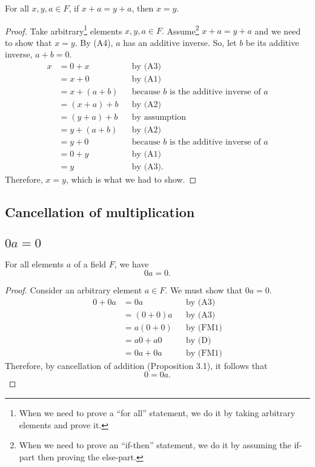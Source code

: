 \documentclass[11pt]{article}
\begin{document}
    For all \(x,y,a \in F\), if \(x + a = y + a\), then \(x = y\).
    \begin{proof}
        Take arbitrary\footnote{When we need to prove a ``for all'' statement, we do it by taking arbitrary elements and prove it.} elements \(x,y,a \in F.\) Assume\footnote{When we need to prove an ``if-then'' statement, we do it by assuming the if-part then proving the else-part.} \(x + a = y + a\) and we need to show that \(x = y\). By (A4), $a$ has an additive inverse. So, let $b$ be its additive inverse, \(a + b = 0.\)
        \begin{align*}
            x &= 0 + x          && \text{by (A3)} \\
              &= x + 0          && \text{by (A1)} \\
              &= x + (a + b)    && \text{because $b$ is the additive inverse of $a$} \\
              &= (x + a) + b    && \text{by (A2)} \\
              &= (y + a) + b    && \text{by assumption} \\
              &= y + (a + b)    && \text{by (A2)} \\
              &= y + 0          && \text{because $b$ is the additive inverse of $a$} \\
              &= 0 + y          && \text{by (A1)} \\
              &= y              && \text{by (A3).}
        \end{align*}
        Therefore, \(x = y\), which is what we had to show.
    \end{proof}

    \subsection{Cancellation of multiplication}

    \subsection{$0a = 0$}

    For all elements $a$ of a field $F$, we have \[0a = 0.\]
    \begin{proof}
        Consider an arbitrary element \(a \in F.\) We must show that \(0a = 0.\)
        \begin{align*}
            0 + 0a &= 0a        && \text{by (A3)} \\
                   &= (0+0)a    && \text{by (A3)} \\
                   &= a(0 + 0)  && \text{by (FM1)} \\
                   &= a0 + a0   && \text{by (D)} \\
                   &= 0a + 0a   && \text{by (FM1)}
        \end{align*}
        Therefore, by cancellation of addition (Proposition 3.1), it follows that \[0 = 0a.\]
    \end{proof}
\end{document}
